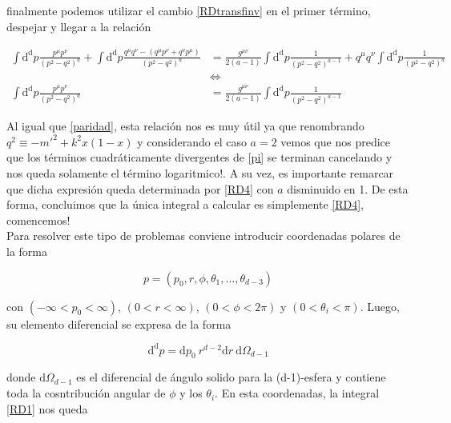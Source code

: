 \documentclass[tickz]{article}
\numberwithin{equation}{section}
\begin{document}
finalmente podemos utilizar el cambio \ref{RDtransfinv} en el primer término, despejar y llegar a la relación

\begin{equation}\label{picancel}
\begin{aligned}
\int\mathrm{d^d}p \frac{p^{\mu}p^{\nu}}{\left(p^2 -q^2 \right)^a} + \int\mathrm{d^d}p \frac{q^{\mu}q^{\nu} -\left(q^{\mu}p^{\nu} + q^{\nu}p^{\mu}\right)}{\left(p^2 -q^2\right)^a} &= \frac{g^{\mu\nu}}{2(a-1)}\int\mathrm{d^d}p \frac{1}{\left(p^2 -q^2\right)^{a-1}} + q^{\mu}q^{\nu}\int\mathrm{d^d}p \frac{1}{\left(p^2 -q^2\right)^a}\\
& \iff\\
\int\mathrm{d^d}p \frac{p^{\mu}p^{\nu}}{\left(p^2 -q^2 \right)^a} &= \frac{g^{\mu\nu}}{2(a-1)}\int\mathrm{d^d}p \frac{1}{\left(p^2 -q^2\right)^{a-1}}
\end{aligned}
\end{equation}

Al igual que \ref{paridad}, esta relación nos es muy útil ya que renombrando $ q^2 \equiv -m'^2 + k^2x(1-x) $ y considerando el caso $ a=2 $ vemos que nos predice que los términos cuadráticamente divergentes de \ref{pi} se terminan cancelando y nos queda solamente el término logaritmico!. A su vez, es importante remarcar que dicha expresión queda determinada por \ref{RD4} con $ a $ disminuido en 1. De esta forma, concluimos que la única integral a calcular es simplemente \ref{RD4}, comencemos!\\

Para resolver este tipo de problemas conviene introducir coordenadas polares de la forma

\begin{equation}\label{key}
p = \left(p_0,r,\phi,\theta_1,...,\theta_{d-3}\right)
\end{equation}

con $ \left(-\infty < p_0 < \infty\right)  $, $ \left(0 < r < \infty\right)  $, $ \left(0 < \phi < 2\pi\right)  $ y $ \left(0 < \theta_i < \pi\right)  $. Luego, su elemento diferencial se expresa de la forma

\begin{equation}\label{key}
\mathrm{d^d}p=\mathrm{d}p_0 \ r^{d-2} \mathrm{d}r \ \mathrm{d} \Omega_{d-1}
\end{equation}

donde $ \mathrm{d} \Omega_{d-1} $ es el diferencial de ángulo solido para la (d-1)-esfera y contiene toda la cosntribución angular de $ \phi $ y los $ \theta_i $. En esta coordenadas, la integral \ref{RD1} nos queda
\end{document}
